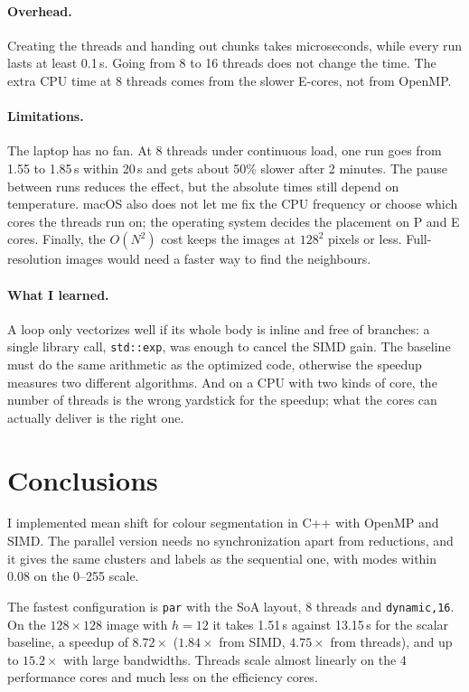 \documentclass[10pt,twocolumn,letterpaper]{article}
\newcommand{\x}{\ensuremath{\times}}
\begin{document}
\paragraph{Overhead.} Creating the threads and handing out chunks takes microseconds, while every
run lasts at least 0.1\,s. Going from 8 to 16 threads does not change the time. The extra CPU time
at 8 threads comes from the slower E-cores, not from OpenMP.

\paragraph{Limitations.} The laptop has no fan. At 8 threads under continuous load, one run goes
from 1.55 to 1.85\,s within 20\,s and gets about 50\% slower after 2 minutes. The pause between
runs reduces the effect, but the absolute times still depend on temperature. macOS also does not
let me fix the CPU frequency or choose which cores the threads run on; the operating system decides
the placement on P and E cores. Finally, the $O(N^2)$ cost keeps the images at $128^2$ pixels or
less. Full-resolution images would need a faster way to find the neighbours.

\paragraph{What I learned.} A loop only vectorizes well if its whole body is inline and free of
branches: a single library call, \texttt{std::exp}, was enough to cancel the SIMD gain. The
baseline must do the same arithmetic as the optimized code, otherwise the speedup measures two
different algorithms. And on a CPU with two kinds of core, the number of threads is the wrong
yardstick for the speedup; what the cores can actually deliver is the right one.

\section{Conclusions}
I implemented mean shift for colour segmentation in C++ with OpenMP and SIMD. The parallel version
needs no synchronization apart from reductions, and it gives the same clusters and labels as the
sequential one, with modes within 0.08 on the 0--255 scale.

The fastest configuration is \texttt{par} with the SoA layout, 8 threads and \texttt{dynamic,16}.
On the $128\x128$ image with $h = 12$ it takes 1.51\,s against 13.15\,s for the scalar baseline,
a speedup of $8.72\x$ ($1.84\x$ from SIMD, $4.75\x$ from threads), and up to $15.2\x$ with large
bandwidths. Threads scale almost linearly on the 4 performance cores and much less on the
efficiency cores.
\end{document}
